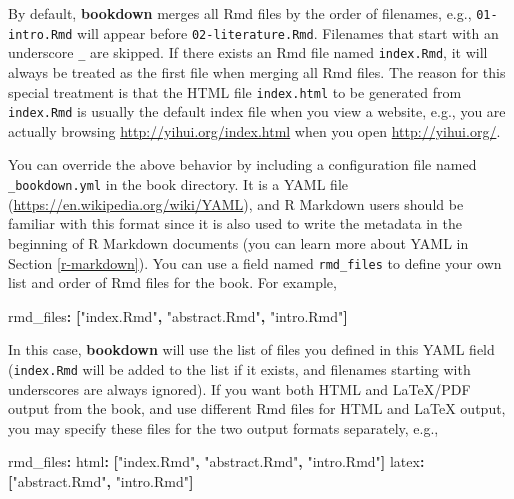 \documentclass[
]{book}
\newenvironment{Shaded}{\begin{snugshade}}{\end{snugshade}}
\newcommand{\AttributeTok}[1]{\textcolor[rgb]{0.77,0.63,0.00}{#1}}
\newcommand{\FunctionTok}[1]{\textcolor[rgb]{0.00,0.00,0.00}{#1}}
\newcommand{\KeywordTok}[1]{\textcolor[rgb]{0.13,0.29,0.53}{\textbf{#1}}}
\newcommand{\StringTok}[1]{\textcolor[rgb]{0.31,0.60,0.02}{#1}}
\begin{document}
By default, \textbf{bookdown} merges all Rmd files by the order of filenames, e.g., \texttt{01-intro.Rmd} will appear before \texttt{02-literature.Rmd}. Filenames that start with an underscore \texttt{\_} are skipped. If there exists an Rmd file named \texttt{index.Rmd}, it will always be treated as the first file when merging all Rmd files. The reason for this special treatment is that the HTML file \texttt{index.html} to be generated from \texttt{index.Rmd} is usually the default index file when you view a website, e.g., you are actually browsing \url{http://yihui.org/index.html} when you open \url{http://yihui.org/}.

You can override the above behavior by including a configuration file named \texttt{\_bookdown.yml} in the book directory. It is a YAML file (\url{https://en.wikipedia.org/wiki/YAML}), and R Markdown users should be familiar with this format since it is also used to write the metadata in the beginning of R Markdown documents (you can learn more about YAML in Section \ref{r-markdown}). You can use a field named \texttt{rmd\_files} to define your own list and order of Rmd files for the book. For example,

\begin{Shaded}
\begin{Highlighting}[]
\FunctionTok{rmd\_files}\KeywordTok{:}\AttributeTok{ }\KeywordTok{[}\StringTok{"index.Rmd"}\KeywordTok{,}\AttributeTok{ }\StringTok{"abstract.Rmd"}\KeywordTok{,}\AttributeTok{ }\StringTok{"intro.Rmd"}\KeywordTok{]}
\end{Highlighting}
\end{Shaded}

In this case, \textbf{bookdown} will use the list of files you defined in this YAML field (\texttt{index.Rmd} will be added to the list if it exists, and filenames starting with underscores are always ignored). If you want both HTML and LaTeX/PDF output from the book, and use different Rmd files for HTML and LaTeX output, you may specify these files for the two output formats separately, e.g.,

\begin{Shaded}
\begin{Highlighting}[]
\FunctionTok{rmd\_files}\KeywordTok{:}
\AttributeTok{  }\FunctionTok{html}\KeywordTok{:}\AttributeTok{ }\KeywordTok{[}\StringTok{"index.Rmd"}\KeywordTok{,}\AttributeTok{ }\StringTok{"abstract.Rmd"}\KeywordTok{,}\AttributeTok{ }\StringTok{"intro.Rmd"}\KeywordTok{]}
\AttributeTok{  }\FunctionTok{latex}\KeywordTok{:}\AttributeTok{ }\KeywordTok{[}\StringTok{"abstract.Rmd"}\KeywordTok{,}\AttributeTok{ }\StringTok{"intro.Rmd"}\KeywordTok{]}
\end{Highlighting}
\end{Shaded}
\end{document}
